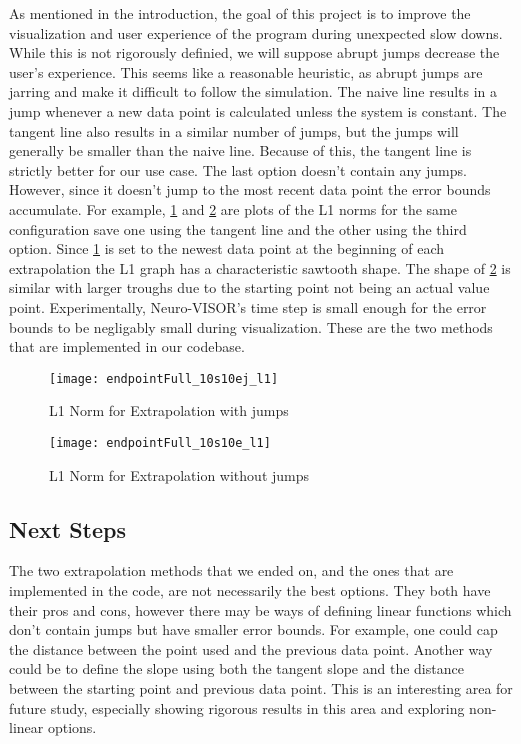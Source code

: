 As mentioned in the introduction, the goal of this project is to improve the visualization and user experience of the program during unexpected slow downs.
While this is not rigorously definied, we will suppose abrupt jumps decrease the user's experience.
This seems like a reasonable heuristic, as abrupt jumps are jarring and make it difficult to follow the simulation.
The naive line results in a jump whenever a new data point is calculated unless the system is constant.
The tangent line also results in a similar number of jumps, but the jumps will generally be smaller than the naive line.
Because of this, the tangent line is strictly better for our use case.
The last option doesn't contain any jumps.
However, since it doesn't jump to the most recent data point the error bounds accumulate.
For example, \cref{fig:l1Jump} and \cref{fig:l1} are plots of the L1 norms for the same configuration save one using the tangent line and the other using the third option.
Since \cref{fig:l1Jump} is set to the newest data point at the beginning of each extrapolation the L1 graph has a characteristic sawtooth shape.
The shape of \cref{fig:l1} is similar with larger troughs due to the starting point not being an actual value point.
Experimentally, Neuro-VISOR's time step is small enough for the error bounds to be negligably small during visualization\cite{neuropy}.
These are the two methods that are implemented in our codebase.

\begin{figure}[H]
    \centering
    \texttt{[image: endpointFull\_10s10ej\_l1]}
    \caption{L1 Norm for Extrapolation with jumps}%
    \label{fig:l1Jump}
\end{figure}

\begin{figure}[H]
    \centering
    \texttt{[image: endpointFull\_10s10e\_l1]}
    \caption{L1 Norm for Extrapolation without jumps}%
    \label{fig:l1}
\end{figure}


\subsection{Next Steps}%
\label{sub:next_steps}

The two extrapolation methods that we ended on, and the ones that are implemented in the code, are not necessarily the best options.
They both have their pros and cons, however there may be ways of defining linear functions which don't contain jumps but have smaller error bounds.
For example, one could cap the distance between the point used and the previous data point.
Another way could be to define the slope using both the tangent slope and the distance between the starting point and previous data point.
This is an interesting area for future study, especially showing rigorous results in this area and exploring non-linear options.
